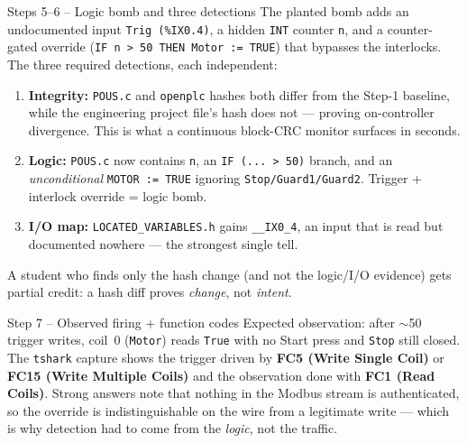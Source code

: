 \documentclass[11pt,a4paper]{article}
\begin{document}
\begin{solutionbox}{Steps 5--6 -- Logic bomb and three detections}
The planted bomb adds an undocumented input \texttt{Trig (\%IX0.4)}, a
hidden \texttt{INT} counter \texttt{n}, and a counter-gated override
(\texttt{IF n > 50 THEN Motor := TRUE}) that bypasses the interlocks. The
three required detections, each independent:
\begin{enumerate}\setlength{\itemsep}{1pt}
  \item \textbf{Integrity:} \texttt{POUS.c} and \texttt{openplc} hashes both
        differ from the Step-1 baseline, while the engineering project
        file's hash does not --- proving on-controller divergence. This is
        what a continuous block-CRC monitor surfaces in seconds.
  \item \textbf{Logic:} \texttt{POUS.c} now contains \texttt{n}, an
        \texttt{IF (... > 50)} branch, and an \emph{unconditional}
        \texttt{MOTOR := TRUE} ignoring \texttt{Stop/Guard1/Guard2}. Trigger
        + interlock override = logic bomb.
  \item \textbf{I/O map:} \texttt{LOCATED\_VARIABLES.h} gains
        \texttt{\_\_IX0\_4}, an input that is read but documented nowhere ---
        the strongest single tell.
\end{enumerate}
A student who finds only the hash change (and not the logic/I/O evidence)
gets partial credit: a hash diff proves \emph{change}, not \emph{intent}.
\end{solutionbox}

\begin{solutionbox}{Step 7 -- Observed firing + function codes}
Expected observation: after $\sim$50 trigger writes, coil~0
(\texttt{Motor}) reads \texttt{True} with no Start press and \texttt{Stop}
still closed. The \texttt{tshark} capture shows the trigger driven by
\textbf{FC5 (Write Single Coil)} or \textbf{FC15 (Write Multiple Coils)}
and the observation done with \textbf{FC1 (Read Coils)}. Strong answers note
that nothing in the Modbus stream is authenticated, so the override is
indistinguishable on the wire from a legitimate write --- which is why
detection had to come from the \emph{logic}, not the traffic.
\end{solutionbox}
\end{document}
